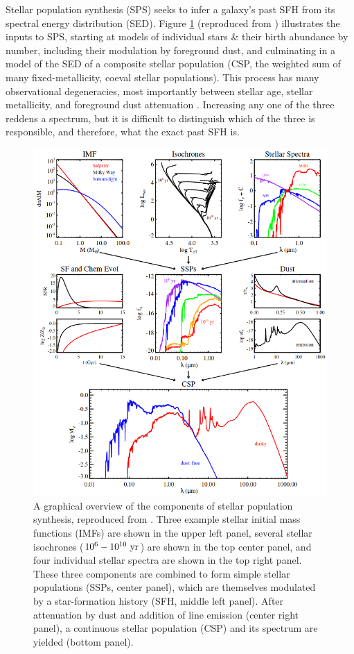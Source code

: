 Stellar population synthesis (SPS) seeks to infer a galaxy's past SFH from its spectral energy distribution (SED). Figure \ref{fig:conroy_sps_figure} (reproduced from \citet{conroy_sps_review}) illustrates the inputs to SPS, starting at models of individual stars \& their birth abundance by number, including their modulation by foreground dust, and culminating in a model of the SED of a composite stellar population (CSP, the weighted sum of many fixed-metallicity, coeval stellar populations). This process has many observational degeneracies, most importantly between stellar age, stellar metallicity, and foreground dust attenuation \citep{mcgaugh_schombert_schombert_14}. Increasing any one of the three reddens a spectrum, but it is difficult to distinguish which of the three is responsible, and therefore, what the exact past SFH is.

\begin{figure}
    \centering
    \includegraphics[width=\textwidth]{conroy_sps_review}
    \caption[A graphical overview of the components of stellar population synthesis.]{\fixspacing A graphical overview of the components of stellar population synthesis, reproduced from \citet{conroy_sps_review}. Three example stellar initial mass functions (IMFs) are shown in the upper left panel, several stellar isochrones ($10^6 - 10^{10} ~ {\rm yr}$) are shown in the top center panel, and four individual stellar spectra are shown in the top right panel. These three components are combined to form simple stellar populations (SSPs, center panel), which are themselves modulated by a star-formation history (SFH, middle left panel). After attenuation by dust and addition of line emission (center right panel), a continuous stellar population (CSP) and its spectrum are yielded (bottom panel).}
    \label{fig:conroy_sps_figure}
\end{figure}

